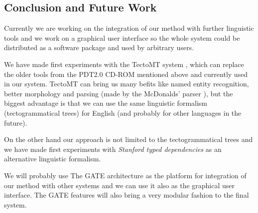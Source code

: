 \begin{multicols}{2}
\section{Conclusion and Future Work}

Currently we are working on the integration of our method with further linguistic tools and we work on a graphical user interface so the whole system could be distributed as a software package and used by arbitrary users.

We have made first experiments with the TectoMT system \cite{dedek:ZaPtTectoMTHighly2008}, which can replace the older tools from the PDT2.0 CD-ROM mentioned above and currently used in our system. TectoMT can bring us many befits like named entity recognition, better morphology and parsing (made by the McDonalds' parser \cite{dedek:mcdonald}), but the biggest advantage is that we can use the same linguistic formalism (tectogrammatical trees) for English (and probably for other languages in the future).

On the other hand our approach is not limited to the tectogrammatical trees and we have made first experiments with \emph{Stanford typed dependencies} \cite{dedek:staford_dependecies} as an alternative linguistic formalism.

We will probably use The GATE architecture \cite{dedek:GATE} as the platform for integration of our method with other systems and we can use it also as the graphical user interface. The GATE features will also bring a very modular fashion to the final system.









\end{multicols}








